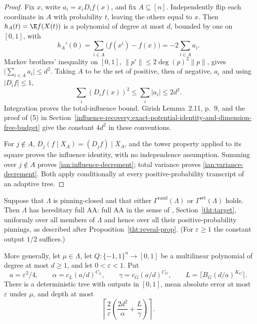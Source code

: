 \begin{proof}
Fix \(x\), write \(a_i=x_iD_i f(x)\), and fix \(A\subseteq[n]\).
Independently flip each coordinate in \(A\) with probability \(t\),
leaving the others equal to \(x\). Then \(h_A(t)=\E f(X(t))\) is a
polynomial of degree at most \(d\), bounded by one on \([0,1]\), with
\[
 h_A'(0)=\sum_{i\in A}\bigl(f(x^i)-f(x)\bigr)
        =-2\sum_{i\in A}a_i.
\]
Markov brothers' inequality on \([0,1]\),
\(\|p'\|\le2\deg(p)^2\|p\|\), gives
\(\lvert\sum_{i\in A}a_i\rvert\le d^2\).
Taking \(A\) to be the set of positive, then of negative, \(a_i\) and
using \(|D_i f|\le1\),
\[
 \sum_i(D_i f(x))^2
 \le\sum_i|a_i|\le2d^2.
\]
Integration proves the total-influence bound. Girish Lemma~2.11, p.~9,
and the proof of (5) in
Section~\ref{influence-recovery:exact-potential-identity-and-dimension-free-budget}
give the constant \(4d^2\) in these conventions.

For \(j\notin A\), \(D_j(f\mid X_A)=(D_j f)\mid X_A\), and the tower
property applied to its square proves the influence identity, with no
independence assumption. Summing over \(j\notin A\) proves
\eqref{ian:influence-decrement}; total variance proves
\eqref{ian:variance-decrement}. Both apply conditionally at every
positive-probability transcript of an adaptive tree.
\end{proof}

\begin{theorem}
\label{ian:bridge}
Suppose that \(\Lambda\) is pinning-closed and that either
\(\Gamma^{\mathrm{rand}}(\Lambda)\) or
\(\Gamma^{\mathrm{set}}(\Lambda)\) holds. Then \(\Lambda\) has hereditary
full AA: full AA in the sense of
,
Section~\ref{tht:target}, uniformly over all members of \(\Lambda\) and hence over all their positive-probability pinnings, as described after Proposition~\ref{tht:reveal-prop}. (For \(\varepsilon\ge1\) the constant output \(1/2\) suffices.)

More generally, let \(\mu\in\Lambda\), let
\(Q:\{-1,1\}^n\to[0,1]\) be a multilinear polynomial of degree at most
\(d\ge1\), and let \(0<\varepsilon<1\). Put
\[
 a=\varepsilon^2/4,\qquad
 \alpha=c_L(a/d)^{C_L},\qquad
 \gamma=c_G(a/d)^{C_G},\qquad
 L=\lceil B_G(d/a)^{K_G}\rceil .
\]
There is a deterministic tree with outputs in \([0,1]\), mean absolute
error at most \(\varepsilon\) under \(\mu\), and depth at most
\[
 \left\lceil
 \frac{2}{\varepsilon}
 \left(\frac{2d^2}{\alpha}+\frac{L}{\gamma}\right)
 \right\rceil.
 \tag{3}\label{ian:bridge-depth}
\]
\end{theorem}

